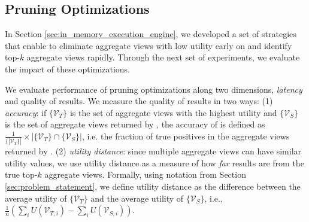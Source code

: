 
\subsection{Pruning Optimizations}
\label{sec:custom_execution_engine_expts}
In Section \ref{sec:in_memory_execution_engine}, we developed a set of strategies that enable \SeeDB to eliminate aggregate views with low utility early on and identify top-$k$ aggregate views rapidly.
Through the next set of experiments, we evaluate 
the impact of these optimizations.

We evaluate performance of pruning optimizations along two dimensions, {\em latency} and
quality of results.
We measure the quality of results in two ways: 
(1) {\em accuracy}: if $\{\mathcal{V}_T\}$
is the set of aggregate views with the highest utility and $\{\mathcal{V}_S\}$ is the set of aggregate views returned by
\SeeDB, the accuracy of \SeeDB is defined as $\frac{1}{\{|\mathcal{V}_T\}|} \times 
|\{\mathcal{V}_T\} \cap \{\mathcal{V}_S\}|$, i.e. the
fraction of true positives in the aggregate views returned by \SeeDB. (2) {\em utility distance}: since multiple
aggregate views can have similar utility values, we use utility distance as a measure of how {\it far} \SeeDB 
results are from the true top-$k$ aggregate views. 
Formally, using notation from Section \ref{sec:problem_statement}, we define utility distance as the difference between the average utility of $\{\mathcal{V}_T\}$ 
and the average utility of $\{\mathcal{V}_S\}$, i.e., $\frac{1}{n}(\sum_{i}U(\mathcal{V}_{T,i}) - 
\sum_{i}U(\mathcal{V}_{S,i}))$.

